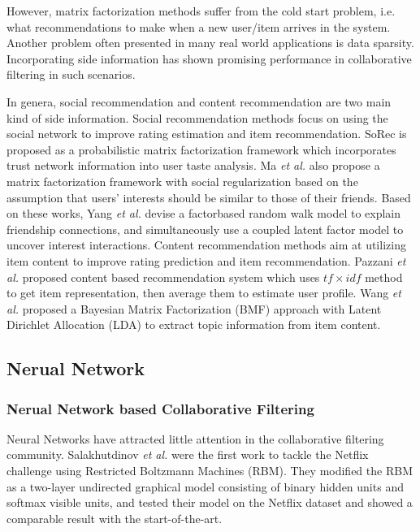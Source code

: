 \documentclass{sig-alternate-05-2015}
\begin{document}
However, matrix factorization methods suffer from the cold start problem,
i.e. what recommendations to make when a new user/item arrives in the system.
Another problem often presented in many real world applications is data sparsity.
Incorporating side information has shown promising performance
in collaborative filtering in such scenarios.

In genera, social recommendation and content recommendation
are two main kind of side information.
Social recommendation methods focus on using the social network
to improve rating estimation and item recommendation.
SoRec \cite{ma2008sorec} is proposed as a probabilistic matrix
factorization framework which incorporates trust network information
into user taste analysis.
Ma \textit{et al.} \cite{ma2011recommender} also propose a matrix factorization framework
with social regularization based on the assumption
that users’ interests should be similar to those of their friends.
Based on these works, Yang \textit{et al.} \cite{yang2011like}
devise a factorbased random walk model to explain friendship connections,
and simultaneously use a coupled latent factor model to uncover interest interactions.
Content recommendation methods aim at utilizing item content
to improve rating prediction and item recommendation.
Pazzani \textit{et al.} \cite{pazzani2007content}
proposed content based recommendation system
which uses $tf \times idf$ method to get item representation,
then average them to estimate user profile.
Wang \textit{et al.} \cite{wang2011collaborative}
proposed a Bayesian Matrix Factorization (BMF) approach
with Latent Dirichlet Allocation (LDA) to extract topic
information from item content.

\subsection{Nerual Network}
\subsubsection{Nerual Network based Collaborative Filtering}
Neural Networks have attracted little attention in the
collaborative filtering community.
Salakhutdinov \textit{et al.} \cite{salakhutdinov2007restricted} were the first
work to tackle the Netflix challenge using Restricted Boltzmann Machines (RBM).
They modified the RBM as a two-layer undirected graphical model
consisting of binary hidden units and softmax visible units,
and tested their model on the Netflix dataset and
showed a comparable result with the start-of-the-art.
\end{document}

